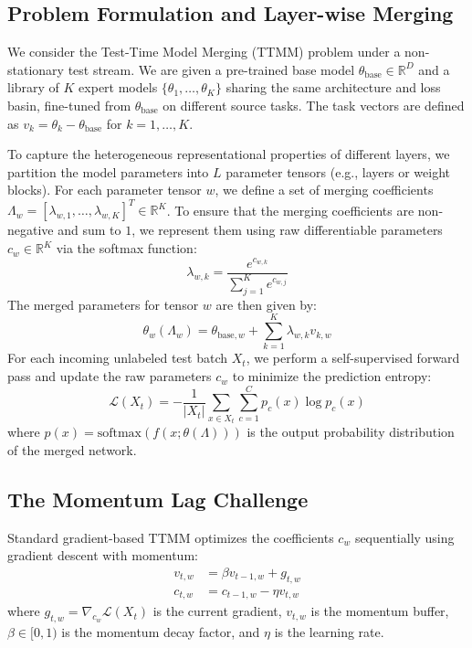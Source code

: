 \documentclass{article}
\theoremstyle{plain}
\theoremstyle{definition}
\theoremstyle{remark}
\begin{document}
\subsection{Problem Formulation and Layer-wise Merging}
We consider the Test-Time Model Merging (TTMM) problem under a non-stationary test stream. We are given a pre-trained base model $\theta_{\text{base}} \in \mathbb{R}^D$ and a library of $K$ expert models $\{\theta_1, \dots, \theta_K\}$ sharing the same architecture and loss basin, fine-tuned from $\theta_{\text{base}}$ on different source tasks. The task vectors are defined as $v_k = \theta_k - \theta_{\text{base}}$ for $k = 1, \dots, K$.

To capture the heterogeneous representational properties of different layers, we partition the model parameters into $L$ parameter tensors (e.g., layers or weight blocks). For each parameter tensor $w$, we define a set of merging coefficients $\Lambda_w = [\lambda_{w,1}, \dots, \lambda_{w,K}]^T \in \mathbb{R}^K$. To ensure that the merging coefficients are non-negative and sum to $1$, we represent them using raw differentiable parameters $c_w \in \mathbb{R}^K$ via the softmax function:
\begin{equation}
    \lambda_{w,k} = \frac{e^{c_{w,k}}}{\sum_{j=1}^K e^{c_{w,j}}}
\end{equation}
The merged parameters for tensor $w$ are then given by:
\begin{equation}
    \theta_w(\Lambda_w) = \theta_{\text{base}, w} + \sum_{k=1}^K \lambda_{w,k} v_{k,w}
\end{equation}
For each incoming unlabeled test batch $X_t$, we perform a self-supervised forward pass and update the raw parameters $c_w$ to minimize the prediction entropy:
\begin{equation}
    \mathcal{L}(X_t) = -\frac{1}{|X_t|} \sum_{x \in X_t} \sum_{c=1}^C p_c(x) \log p_c(x)
\end{equation}
where $p(x) = \text{softmax}(f(x; \theta(\Lambda)))$ is the output probability distribution of the merged network.

\subsection{The Momentum Lag Challenge}
Standard gradient-based TTMM optimizes the coefficients $c_w$ sequentially using gradient descent with momentum:
\begin{align}
    v_{t, w} &= \beta v_{t-1, w} + g_{t, w} \\
    c_{t, w} &= c_{t-1, w} - \eta v_{t, w}
\end{align}
where $g_{t, w} = \nabla_{c_w} \mathcal{L}(X_t)$ is the current gradient, $v_{t, w}$ is the momentum buffer, $\beta \in [0, 1)$ is the momentum decay factor, and $\eta$ is the learning rate.
\end{document}
